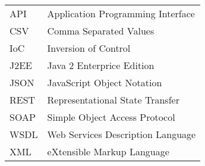 
\seznamzkr

\begin{tabular}{ll}
  API	& Application Programming Interface	\\
  CSV	& Comma Separated Values			\\
  IoC	& Inversion of Control				\\
  J2EE	& Java 2 Enterprice Edition			\\
  JSON	& JavaScript Object Notation		\\
  REST	& Representational State Transfer	\\
  SOAP	& Simple Object Access Protocol 	\\
  WSDL	& Web Services Description Language	\\
  XML	& eXtensible Markup Language		\\
\end{tabular}

